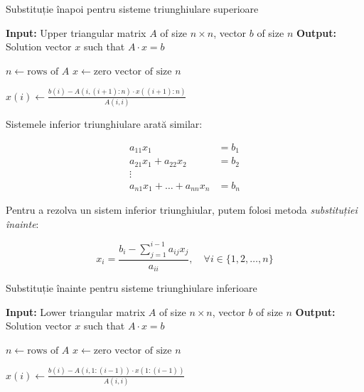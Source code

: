 \documentclass{exam}
\newcommand{\octavescript}[2]{
	
}
\begin{document}
\begin{algorithm}
	\caption{Substituție înapoi pentru sisteme triunghiulare superioare}
	\begin{algorithmic}[1]
		\State \textbf{Input:} Upper triangular matrix \( A \) of size \( n \times n \), vector \( b \) of size \( n \)
		\State \textbf{Output:} Solution vector \( x \) such that \( A \cdot x = b \)

		\State \( n \gets \text{rows of } A \)
		\State \( x \gets \text{zero vector of size } n \)

		\State \( x(i) \gets \frac{b(i) - A(i, (i+1):n) \cdot x((i+1):n)}{A(i, i)} \)
		\EndFor
	\end{algorithmic}
\end{algorithm}

\par Sistemele inferior triunghiulare arată similar:

\begin{align*}
	a_{11} x_1                       & = b_1 \\
	a_{21} x_1 + a_{22} x_2          & = b_2 \\
	\vdots                                   \\
	a_{n1} x_1 + \ldots + a_{nn} x_n & = b_n
\end{align*}

\par Pentru a rezolva un sistem inferior triunghiular, putem folosi metoda
\textit{substituției înainte}:

\begin{equation}
	x_i = \frac{b_i - \sum_{j = 1}^{i - 1}{a_{ij} x_j}}{a_{ii}}, \quad \forall i \in \{1, 2, \ldots, n\}
\end{equation}


\begin{algorithm}
	\caption{Substituție înainte pentru sisteme triunghiulare inferioare}
	\begin{algorithmic}[1]
		\State \textbf{Input:} Lower triangular matrix \( A \) of size \( n \times n \), vector \( b \) of size \( n \)
		\State \textbf{Output:} Solution vector \( x \) such that \( A \cdot x = b \)

		\State \( n \gets \text{rows of } A \)
		\State \( x \gets \text{zero vector of size } n \)

		\State \( x(i) \gets \frac{b(i) - A(i, 1:(i-1)) \cdot x(1:(i-1))}{A(i, i)} \)
		\EndFor

	\end{algorithmic}
\end{algorithm}
\end{document}
